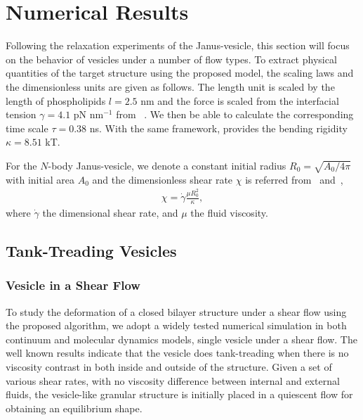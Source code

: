 \documentclass[lineno]{jfm}
\begin{document}


\section{\label{results}Numerical Results}


Following the relaxation experiments of the Janus-vesicle, this section will focus on the behavior of vesicles 
under a number of flow types. To extract physical quantities of the target structure using the proposed model, the scaling laws and the dimensionless units are given as follows.
The length unit is scaled by the length of phospholipids $l=2.5$ nm and the force is scaled from the 
interfacial tension $\gamma=4.1$ pN nm$^{-1}$ from ~\cite{Ryham16}. We then be able to calculate the corresponding 
time scale $\tau = 0.38$ ns. With the same framework, \cite{Fu20} provides the bending rigidity 
$\kappa=8.51$ kT.

For the $N$-body Janus-vesicle, we denote a constant initial radius $R_0=\sqrt{A_0/4\pi}$ with initial area $A_0$ and the dimensionless shear rate $\chi$ is referred from~\cite{Finken08} and~\cite{Shaqfeh11},
\begin{align}
  \chi = \dot\gamma \frac{\mu R_0^2}{\kappa},
\end{align}
%
where $\dot\gamma$ the dimensional shear rate, and $\mu$ the fluid viscosity.


\subsection{Tank-Treading Vesicles}

\subsubsection{Vesicle in a Shear Flow}

To study the deformation of a closed bilayer structure under a shear flow using the proposed algorithm, 
we adopt a widely tested numerical simulation in both continuum and molecular dynamics models, single vesicle under a shear flow. The well known results indicate that the vesicle does tank-treading when there is no viscosity contrast in both inside and outside of the structure.
Given a set of various shear rates, with no viscosity difference between internal and external fluids, 
the vesicle-like granular structure is initially placed in a quiescent flow for obtaining an equilibrium shape.
\end{document}
